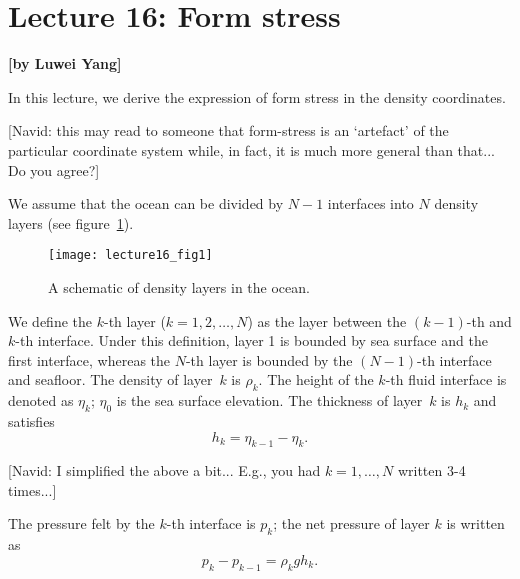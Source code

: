 
\section{Lecture 16: Form stress}
\begin{flushright}\textbf{[by Luwei Yang]}\end{flushright}


In this lecture, we derive the expression of form stress {\color{red}in the density coordinates}.

{\color{red}[Navid: this may read to someone that form-stress is an `artefact' of the particular coordinate system while, in fact, it is much more general than that... Do you agree?]}

We assume that the ocean can be divided by $N-1$ interfaces into $N$ density layers (see figure~\ref{fig:lecture16_form_stress_schematic}). 

\begin{figure}[!ht]
    \centering
    \texttt{[image: lecture16\_fig1]}
    \caption{A schematic of density layers in the ocean.}
    \label{fig:lecture16_form_stress_schematic}
\end{figure}

We define the $k$-th layer ($k = 1, 2, \dots, N$) as the layer between the $(k-1)$-th and $k$-th interface. Under this definition, layer 1 is bounded by sea surface and the first interface, whereas the $N$-th  layer is bounded by the $(N-1)$-th interface and seafloor. The density of layer~$k$ is $\rho_{k}$. The height of the $k$-th fluid interface is denoted as $\eta_k$; $\eta_0$ is the sea surface elevation. The thickness of layer~$k$ is $h_{k}$ and satisfies
\begin{equation}
    h_{k} = \eta_{k-1} - \eta_{k}.
    \label{eq: thickness}
\end{equation}

{\color{red}[Navid: I simplified the above a bit... E.g., you had $k=1,\dots,N$ written 3-4 times...]}

The pressure felt by the $k$-th interface is $p_{k}$; the net pressure of layer $k$ is written as
\begin{equation}
    p_{k} - p_{k-1} = \rho_{k}gh_{k}.
    \label{eq: net_pressure}
\end{equation}
 
